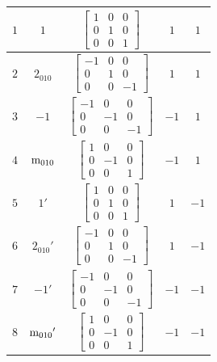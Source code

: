 \documentclass[fleqn,8pt]{jsarticle}
\begin{document}
\begin{longtable}{ccccc}
$ 1 $ & $ 1 $ & $ \begin{bmatrix} 1 & 0 & 0 \\ 0 & 1 & 0 \\ 0 & 0 & 1 \end{bmatrix} $ & $ 1 $ & $ 1 $ \\ \hline
$ 2 $ & $ 2{}_{010} $ & $ \begin{bmatrix} -1 & 0 & 0 \\ 0 & 1 & 0 \\ 0 & 0 & -1 \end{bmatrix} $ & $ 1 $ & $ 1 $ \\ \hline
$ 3 $ & $ -1 $ & $ \begin{bmatrix} -1 & 0 & 0 \\ 0 & -1 & 0 \\ 0 & 0 & -1 \end{bmatrix} $ & $ -1 $ & $ 1 $ \\ \hline
$ 4 $ & $ {\rm m}_{010} $ & $ \begin{bmatrix} 1 & 0 & 0 \\ 0 & -1 & 0 \\ 0 & 0 & 1 \end{bmatrix} $ & $ -1 $ & $ 1 $ \\ \hline
$ 5 $ & $ 1{}' $ & $ \begin{bmatrix} 1 & 0 & 0 \\ 0 & 1 & 0 \\ 0 & 0 & 1 \end{bmatrix} $ & $ 1 $ & $ -1 $ \\ \hline
$ 6 $ & $ 2{}_{010}{}' $ & $ \begin{bmatrix} -1 & 0 & 0 \\ 0 & 1 & 0 \\ 0 & 0 & -1 \end{bmatrix} $ & $ 1 $ & $ -1 $ \\ \hline
$ 7 $ & $ -1{}' $ & $ \begin{bmatrix} -1 & 0 & 0 \\ 0 & -1 & 0 \\ 0 & 0 & -1 \end{bmatrix} $ & $ -1 $ & $ -1 $ \\ \hline
$ 8 $ & $ {\rm m}_{010}{}' $ & $ \begin{bmatrix} 1 & 0 & 0 \\ 0 & -1 & 0 \\ 0 & 0 & 1 \end{bmatrix} $ & $ -1 $ & $ -1 $ \\
\end{longtable}
\end{document}
